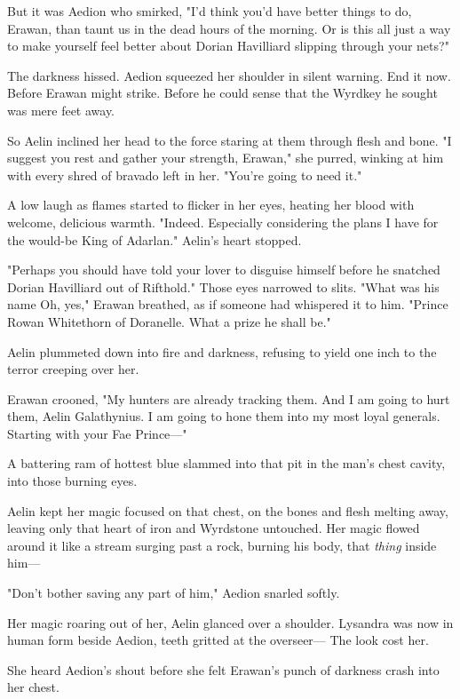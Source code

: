 But it was Aedion who smirked, "I'd think you'd have better things to do, Erawan, than taunt us in the dead hours of the morning. Or is this all just a way to make yourself feel better about Dorian Havilliard slipping through your nets?"

The darkness hissed. Aedion squeezed her shoulder in silent warning. End it now. Before Erawan might strike. Before he could sense that the Wyrdkey he sought was mere feet away.

So Aelin inclined her head to the force staring at them through flesh and bone. "I suggest you rest and gather your strength, Erawan," she purred, winking at him with every shred of bravado left in her. "You're going to need it."

A low laugh as flames started to flicker in her eyes, heating her blood with welcome, delicious warmth. "Indeed. Especially considering the plans I have for the would-be King of Adarlan." Aelin's heart stopped.

"Perhaps you should have told your lover to disguise himself before he snatched Dorian Havilliard out of Rifthold." Those eyes narrowed to slits. "What was his name  Oh, yes," Erawan breathed, as if someone had whispered it to him. "Prince Rowan Whitethorn of Doranelle. What a prize he shall be."

Aelin plummeted down into fire and darkness, refusing to yield one inch to the terror creeping over her.

Erawan crooned, "My hunters are already tracking them. And I am going to hurt them, Aelin Galathynius. I am going to hone them into my most loyal generals. Starting with your Fae Prince---"

A battering ram of hottest blue slammed into that pit in the man's chest cavity, into those burning eyes.

Aelin kept her magic focused on that chest, on the bones and flesh melting away, leaving only that heart of iron and Wyrdstone untouched. Her magic flowed around it like a stream surging past a rock, burning his body, that \emph{thing} inside him---

"Don't bother saving any part of him," Aedion snarled softly.

Her magic roaring out of her, Aelin glanced over a shoulder. Lysandra was now in human form beside Aedion, teeth gritted at the overseer--- The look cost her.

She heard Aedion's shout before she felt Erawan's punch of darkness crash into her chest.

